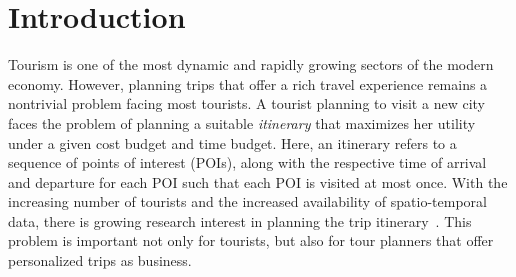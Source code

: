 \section{Introduction}

Tourism is one of the most dynamic and rapidly growing sectors of the modern economy. However, planning trips that offer a rich travel experience remains a nontrivial problem facing most tourists. A tourist planning to visit a new city faces the problem of planning a suitable \emph{itinerary} that maximizes her utility under a given cost budget and time budget. Here, an itinerary refers to a sequence of points of interest (POIs), along with the respective time of arrival and departure for each POI such that each POI is visited at most once. With the increasing number of tourists and the increased availability of spatio-temporal data, there is growing research interest in planning the trip itinerary~\cite{li2016travel, gavalas2014survey, sylejmani2011survey}. This problem is important not only for tourists, but also for tour planners that offer personalized trips as business.

